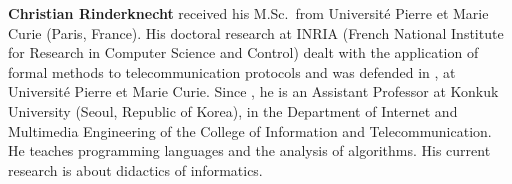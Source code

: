 \noindent\textbf{Christian Rinderknecht} received his M.Sc.~from
Universit\'e Pierre et Marie Curie (Paris, France). His doctoral
research at INRIA (French National Institute for Research in Computer
Science and Control) dealt with the application of formal methods to
telecommunication protocols and was defended in
, at Universit\'e Pierre et Marie Curie. Since
, he is an Assistant Professor at Konkuk University
(Seoul, Republic of Korea), in the Department of Internet and
Multimedia Engineering of the College of Information and
Telecommunication. He teaches programming languages and the analysis
of algorithms. His current research is about didactics of informatics.
